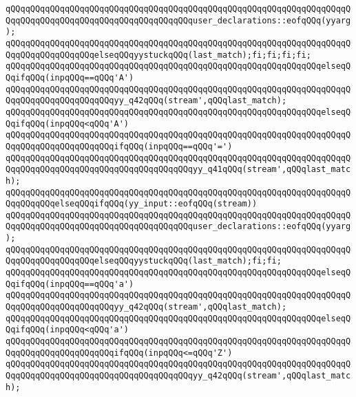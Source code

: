 \verb|qQQqqQQqqQQqqQQqqQQqqQQqqQQqqQQqqQQqqQQqqQQqqQQqqQQqqQQqqQQqqQQqqQQqqQQqqQQqqQQqqQQqqQQqqQQqqQQqqQQqqQQqqQQquser_declarations::eofqQQq(yyarg);|\newline
\verb|qQQqqQQqqQQqqQQqqQQqqQQqqQQqqQQqqQQqqQQqqQQqqQQqqQQqqQQqqQQqqQQqqQQqqQQqqQQqqQQqqQQqqQQqelseqQQqyystuckqQQq(last_match);fi;fi;fi;fi;|\newline
\verb|qQQqqQQqqQQqqQQqqQQqqQQqqQQqqQQqqQQqqQQqqQQqqQQqqQQqqQQqqQQqqQQqelseqQQqifqQQq(inpqQQq==qQQq'A')|\newline
\verb|qQQqqQQqqQQqqQQqqQQqqQQqqQQqqQQqqQQqqQQqqQQqqQQqqQQqqQQqqQQqqQQqqQQqqQQqqQQqqQQqqQQqqQQqqQQqyy_q42qQQq(stream',qQQqlast_match);|\newline
\verb|qQQqqQQqqQQqqQQqqQQqqQQqqQQqqQQqqQQqqQQqqQQqqQQqqQQqqQQqqQQqqQQqelseqQQqifqQQq(inpqQQq<qQQq'A')|\newline
\verb|qQQqqQQqqQQqqQQqqQQqqQQqqQQqqQQqqQQqqQQqqQQqqQQqqQQqqQQqqQQqqQQqqQQqqQQqqQQqqQQqqQQqqQQqqQQqifqQQq(inpqQQq==qQQq'=')|\newline
\verb|qQQqqQQqqQQqqQQqqQQqqQQqqQQqqQQqqQQqqQQqqQQqqQQqqQQqqQQqqQQqqQQqqQQqqQQqqQQqqQQqqQQqqQQqqQQqqQQqqQQqqQQqqQQqyy_q41qQQq(stream',qQQqlast_match);|\newline
\verb|qQQqqQQqqQQqqQQqqQQqqQQqqQQqqQQqqQQqqQQqqQQqqQQqqQQqqQQqqQQqqQQqqQQqqQQqqQQqqQQqelseqQQqifqQQq(yy_input::eofqQQq(stream))|\newline
\verb|qQQqqQQqqQQqqQQqqQQqqQQqqQQqqQQqqQQqqQQqqQQqqQQqqQQqqQQqqQQqqQQqqQQqqQQqqQQqqQQqqQQqqQQqqQQqqQQqqQQqqQQqqQQquser_declarations::eofqQQq(yyarg);|\newline
\verb|qQQqqQQqqQQqqQQqqQQqqQQqqQQqqQQqqQQqqQQqqQQqqQQqqQQqqQQqqQQqqQQqqQQqqQQqqQQqqQQqqQQqqQQqelseqQQqyystuckqQQq(last_match);fi;fi;|\newline
\verb|qQQqqQQqqQQqqQQqqQQqqQQqqQQqqQQqqQQqqQQqqQQqqQQqqQQqqQQqqQQqqQQqelseqQQqifqQQq(inpqQQq==qQQq'a')|\newline
\verb|qQQqqQQqqQQqqQQqqQQqqQQqqQQqqQQqqQQqqQQqqQQqqQQqqQQqqQQqqQQqqQQqqQQqqQQqqQQqqQQqqQQqqQQqqQQqyy_q42qQQq(stream',qQQqlast_match);|\newline
\verb|qQQqqQQqqQQqqQQqqQQqqQQqqQQqqQQqqQQqqQQqqQQqqQQqqQQqqQQqqQQqqQQqelseqQQqifqQQq(inpqQQq<qQQq'a')|\newline
\verb|qQQqqQQqqQQqqQQqqQQqqQQqqQQqqQQqqQQqqQQqqQQqqQQqqQQqqQQqqQQqqQQqqQQqqQQqqQQqqQQqqQQqqQQqqQQqifqQQq(inpqQQq<=qQQq'Z')|\newline
\verb|qQQqqQQqqQQqqQQqqQQqqQQqqQQqqQQqqQQqqQQqqQQqqQQqqQQqqQQqqQQqqQQqqQQqqQQqqQQqqQQqqQQqqQQqqQQqqQQqqQQqqQQqqQQqyy_q42qQQq(stream',qQQqlast_match);|\newline
